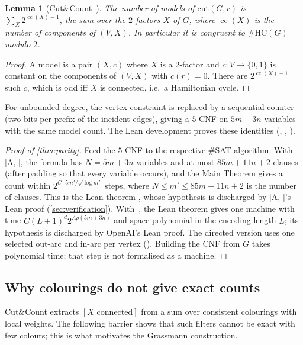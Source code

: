 \documentclass[11pt]{amsart}
\theoremstyle{plain}
\newtheorem{lemma}[theorem]{Lemma}
\theoremstyle{definition}
\theoremstyle{remark}
\numberwithin{equation}{section}
\newcommand{\HC}{\#\mathrm{HC}}
\newcommand{\cc}{\operatorname{cc}}
\newcommand{\A}[1][]{\textup{[A\if\relax\detokenize{#1}\relax\else, #1\fi]}}
\begin{document}
\begin{lemma}[Cut\&Count~\cite{CutAndCount11}]\label{lem:cutcount}
The number of models of $\mathrm{cut}(G,r)$ is $\sum_X2^{\cc(X)-1}$, the sum over the $2$-factors
$X$ of $G$, where $\cc(X)$ is the number of components of $(V,X)$. In particular it is congruent
to $\HC(G)$ modulo $2$.
\end{lemma}

\begin{proof}
A model is a pair $(X,c)$ where $X$ is a $2$-factor and $c\colon V\to\{0,1\}$ is constant on the
components of $(V,X)$ with $c(r)=0$. There are $2^{\cc(X)-1}$ such $c$, which is odd iff $X$ is
connected, i.e.\ a Hamiltonian cycle.
\end{proof}

For unbounded degree, the vertex constraint is replaced by a sequential counter (two bits per
prefix of the incident edges), giving a $5$-CNF on $5m+3n$ variables with the same model count.
The Lean development proves these identities (,
, ).

\begin{proof}[Proof of \cref{thm:parity}]
Feed the $5$-CNF to the respective $\#$SAT algorithm. With \A, the formula has $N=5m+3n$
variables and at most $85m+11n+2$ clauses (after padding so that every variable occurs), and the
Main Theorem gives a count within $2^{C\cdot5m'/\sqrt{\log m'}}$ steps, where $N\le m'\le
85m+11n+2$ is the number of clauses. This is the Lean theorem
, whose hypothesis  is
discharged by \A's Lean proof (\cref{sec:verification}). With~\cite{OpenAI26}, the Lean theorem
 gives one machine with time $C(L+1)^d2^{A\rho(5m+3n)}$ and space
polynomial in the encoding length $L$; its hypothesis  is discharged
by OpenAI's Lean proof. The directed version uses one selected out-arc and in-arc per vertex
(). Building the CNF from $G$ takes polynomial time; that step
is not formalised as a machine.
\end{proof}

\subsection{Why colourings do not give exact counts}
Cut\&Count extracts $[X\text{ connected}]$ from a sum over consistent colourings with local
weights. The following barrier shows that such filters cannot be exact with few colours; this is
what motivates the Grassmann construction.
\end{document}
